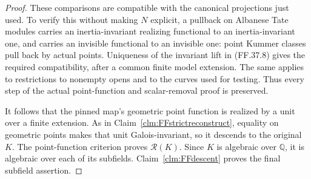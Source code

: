 \begin{proof}
These comparisons are compatible
with the canonical projections just
used. To verify this without making
\(N\) explicit, a pullback on
Albanese Tate modules carries an
inertia-invariant realizing functional
to an inertia-invariant one, and
carries an invisible functional to
an invisible one: point Kummer
classes pull back by actual points.
Uniqueness of the invariant lift
in (FF.37.8) gives the required
compatibility, after a common finite
model extension. The same applies
to restrictions to nonempty opens
and to the curves used for testing.
Thus every step of the actual
point-function and scalar-removal
proof is preserved.

It follows that the pinned map's
geometric point function is realized
by a unit over a finite extension.
As in Claim~\ref{clm:FFstrictreconstruct},
equality on geometric points makes
that unit Galois-invariant, so it
descends to the original \(K\).
The point-function criterion
\citep[Theorem~4.18(5)]{FF_CHW2024}
proves \(\mathcal R(K)\).
Since \(K\) is algebraic over
\(\mathbb Q\), it is algebraic
over each of its subfields.
Claim~\ref{clm:FFdescent} proves
the final subfield assertion.
\end{proof}


